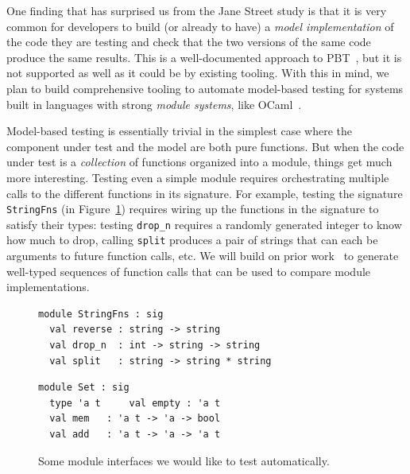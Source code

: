 One finding that has surprised us from the Jane Street study is that
it is {very} common for developers to build (or already to have) a
{\em model
implementation} of the code they are testing and check that the two versions of
the same code produce the same results.  This is a well-documented approach to
PBT~\cite{hughes_experiences_2016}, but it is not supported as well as it could
be by existing tooling.
%
With this in mind, we plan to build comprehensive tooling to automate
model-based testing for systems built in languages with strong {\em
  module systems}, like OCaml~\cite{macqueen_modules_1984}.

Model-based testing is essentially trivial in the simplest case where
the component under test and the model are both pure functions.  But
when the code under test is a {\em
  collection} of functions
organized into a module, things get much more interesting. Testing even a simple
module requires orchestrating multiple calls to the different functions in
its signature. For example, testing the signature \lstinline{StringFns} (in
Figure~\ref{fig:sigs}) requires wiring up the functions in the
signature to satisfy their types: testing \lstinline{drop_n} requires a randomly generated
integer to know how much to drop, calling \lstinline{split} produces a pair of strings
that can each be arguments to future function calls, etc. We will build on prior
work~\cite{hughes_experiences_2016} to generate well-typed sequences of function
calls that can be used to compare module implementations.

\begin{figure}[t]
  \begin{minipage}{.45\textwidth}
\begin{lstlisting}
module StringFns : sig
  val reverse : string -> string
  val drop_n  : int -> string -> string
  val split   : string -> string * string
\end{lstlisting}
  \end{minipage}
  \qquad\qquad
  \begin{minipage}{.45\textwidth}
\begin{lstlisting}
module Set : sig
  type 'a t     val empty : 'a t
  val mem   : 'a t -> 'a -> bool
  val add   : 'a t -> 'a -> 'a t
\end{lstlisting}
  \end{minipage}
  \vspace{-2mm}
  \caption{Some module interfaces we would like to test
    automatically.}\label{fig:sigs}
\end{figure}


